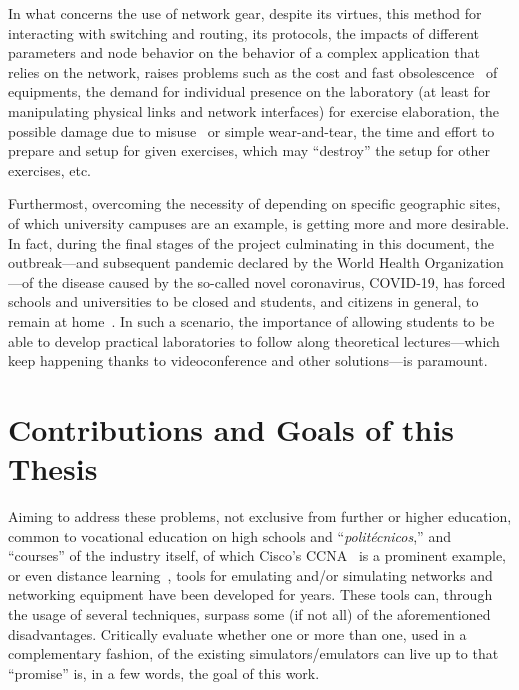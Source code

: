 In what concerns the use of network gear, despite its virtues, this method for interacting with switching and routing, its protocols, the impacts of different parameters and node behavior on the behavior of a complex application that relies on the network, raises problems such as the cost and fast obsolescence~\cite{automaticnetconfiggns} of equipments, the demand for individual presence on the laboratory (at least for manipulating physical links and network interfaces) for exercise elaboration, the possible damage due to misuse~\cite{teachinginovation} or simple wear-and-tear, the time and effort to prepare and setup for given exercises, which may ``destroy'' the setup for other exercises, etc. %

Furthermost, overcoming the necessity of depending on specific geographic sites, of which university campuses are an example, is getting more and more desirable.
In fact, during the final stages of the project culminating in this document, the outbreak---and subsequent pandemic declared by the World Health Organization---of the disease caused by the so-called novel coronavirus, COVID-19, has forced schools and universities to be closed and students, and citizens in general, to remain at home~\cite{covid19}.
In such a scenario, the importance of allowing students to be able to develop practical laboratories to follow along theoretical lectures---which keep happening thanks to videoconference and other solutions---is paramount.

\section{Contributions and Goals of this Thesis}

Aiming to address these problems, not exclusive from further or higher education, common to vocational education on high schools and ``\emph{politécnicos},'' and ``courses'' of the industry itself, of which Cisco's CCNA~\cite{ccna} is a prominent example, or even distance learning~\cite{networkvirtwithgns}, tools for emulating and/or simulating networks and networking equipment have been developed for years. %
These tools can, through the usage of several techniques, surpass some (if not all) of the aforementioned disadvantages.
Critically evaluate whether one or more than one, used in a complementary fashion, of the existing simulators/emulators can live up to that ``promise'' is, in a few words, the goal of this work.

